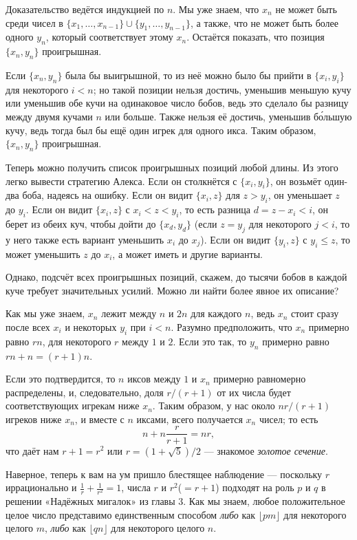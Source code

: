 Доказательство ведётся индукцией по $n$.
Мы уже знаем, что $x_n$ не может быть среди чисел в $\{x_1, \dots , x_{n-1}\} \cup \{y_1, \dots , y_{n-1}\}$, а также, что не может быть более одного $y_n$, который соответствует этому $x_n$.
Остаётся показать, что позиция $\{x_n, y_n\}$ проигрышная.

Если $\{x_n, y_n\}$ была бы выигрышной, то из неё можно было бы прийти в $\{x_i, y_i\}$ для некоторого $i < n$; но такой позиции нельзя достичь, уменьшив меньшую кучу или уменьшив обе кучи на одинаковое число бобов, ведь это сделало бы разницу между двумя кучами $n$ или больше.
Также нельзя её достичь, уменьшив б\'{о}льшую кучу, ведь тогда был бы ещё один игрек для одного икса.
Таким образом, $\{x_n, y_n\}$ проигрышная.

Теперь можно получить список проигрышных позиций любой длины.
Из этого легко вывести стратегию Алекса.
Если он столкнётся с $\{x_i , y_i\}$, он возьмёт один-два боба, надеясь на ошибку.
Если он видит $\{x_i , z\}$ для $z > y_i$, он уменьшает $z$ до $y_i$.
Если он видит $\{x_i , z\}$ с $x_i < z < y_i$, то есть разница $d = z - x_i < i$, он берет из обеих куч, чтобы дойти до $\{x_d , y_d\}$ (если $z = y_j$ для некоторого $j < i$, то у него также есть вариант уменьшить $x_i$ до $x_j$).
Если он видит $\{y_i , z\}$ с $y_i \le z$, то может уменьшить $z$ до $x_i$, а может иметь и другие варианты.


Однако, подсчёт всех проигрышных позиций, скажем, до тысячи бобов в каждой куче требует значительных усилий.
Можно ли найти более явное их описание?

Как мы уже знаем, $x_n$ лежит между $n$ и $2n$ для каждого $n$, ведь $x_n$ стоит сразу после всех $x_i$ и некоторых $y_i$ при $i < n$.
Разумно предположить, что $x_n$ примерно равно $rn$, для некоторого $r$ между $1$ и $2$.
Если это так, то $y_n$ примерно равно $rn + n = (r + 1)n$.

Если это подтвердится, то $n$ иксов между $1$ и $x_n$ примерно равномерно распределены, и, следовательно, доля $r/(r + 1)$ от их числа будет соответствующих игрекам ниже $x_n$.
Таким образом, у нас около $nr/(r + 1)$ игреков ниже $x_n$, и вместе с $n$ иксами, всего получается $x_n$ чисел; то есть
\[n+n\frac{r}{r+1}=nr,\]
что даёт нам $r + 1 = r^2$ или $r = (1 + \sqrt{5})/2$ --- знакомое \emph{золотое сечение}.

Наверное, теперь к вам на ум пришло блестящее наблюдение --- поскольку $r$ иррационально и $\tfrac1r+\tfrac1{r^2}=1$, числа $r$ и $r^2$($= r + 1$) подходят на роль $p$ и $q$ в решении «Надёжных мигалок» из главы 3.
Как мы знаем, любое положительное целое число представимо единственным способом \emph{либо} как $\lfloor pm\rfloor$ для некоторого целого $m$, \emph{либо} как $\lfloor qn\rfloor$ для некоторого целого $n$.

